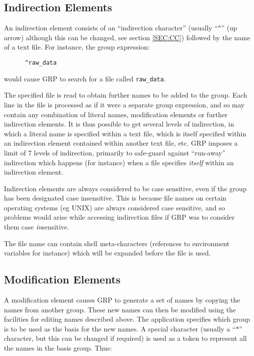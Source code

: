 \subsection{Indirection Elements}
An indirection element consists of an ``indirection character'' (usually
``\verb+^+'' (up arrow) although this can be changed, see section \ref{SEC:CC})
followed by the name of a text file. For instance, the group expression:

\small
\begin{verbatim}
      ^raw_data
\end{verbatim}
\normalsize

would cause GRP to search for a file called \verb+raw_data+.

The specified file is read to obtain further names to be added to the group.
Each line in the file is processed as if it were a separate group expression,
and so may contain any combination of literal names, modification elements or
further indirection elements. It is thus possible to get several levels of
indirection, in which a literal name is specified within a text file, which is
itself specified within an indirection element contained within another text
file, etc. GRP imposes a limit of 7 levels of indirection, primarily to
safe-guard against ``run-away'' indirection which happens (for instance) when a
file specifies {\em itself} within an indirection element.

Indirection elements are always considered to be case sensitive, even if the
group has been designated case insensitive. This is because file names on
certain operating systems (eg UNIX) are always considered case sensitive, and so
problems would arise while accessing indirection files if GRP was to consider
them case {\em in}sensitive.

The file name can contain shell meta-characters (references to
environment variables for instance) which will be expanded before the
file is used.

\subsection{\label{SEC:MOD}Modification Elements}
A modification element causes GRP to generate a set of names by copying the
names from another group. These new names can then be modified using the
facilities for editing names described above. The application specifies which
group is to be used as the basis for the new names. A special character (usually
a ``$*$'' character, but this can be changed if required) is used as a token to
represent all the names in the basis group. Thus:

